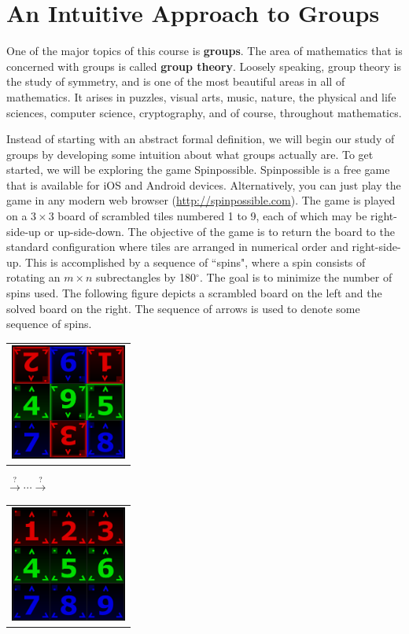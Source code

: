 \chapter{An Intuitive Approach to Groups}
\label{chapter:intuitive_approach_groups}
\thispagestyle{empty}

One of the major topics of this course is \textbf{groups}.  The area of mathematics that is concerned with groups is called \textbf{group theory}. Loosely speaking, group theory is the study of symmetry, and is one of the most beautiful areas in all of mathematics. It arises in puzzles, visual arts, music, nature, the physical and life sciences, computer science, cryptography, and of course, throughout mathematics.

Instead of starting with an abstract formal definition, we will begin our study of groups by developing some intuition about what groups actually are.  To get started, we will be exploring the game Spinpossible.   Spinpossible is a free game that is available for iOS and Android devices. Alternatively, you can just play the game in any modern web browser (\url{http://spinpossible.com}).  The game is played on a $3\times 3$ board of scrambled tiles numbered 1 to 9, each of which may be right-side-up or up-side-down. The objective of the game is to return the board to the standard configuration where tiles are arranged in numerical order and right-side-up. This is accomplished by a sequence of ``spins", where a spin consists of rotating an $m\times n$ subrectangles by 180$^\circ$. The goal is to minimize the number of spins used.  The following figure depicts a scrambled board on the left and the solved board on the right.  The sequence of arrows is used to denote some sequence of spins.

\begin{center}
\begin{tabular}{c}\includegraphics[width=1.5in]{scramble1.PNG}\end{tabular}
{\large $\xrightarrow{?} \cdots \xrightarrow{?}$}
\begin{tabular}{c}\includegraphics[width=1.5in]{scramble4.PNG}\end{tabular}
\end{center}

